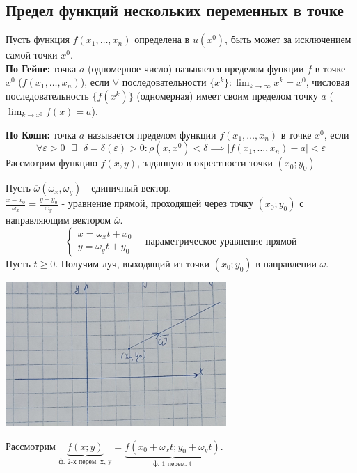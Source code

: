 \documentclass[12pt]{article}
\begin{document}
    \subsection{Предел функций нескольких переменных в точке}
    \noindent Пусть функция $f(x_1, \dots, x_n)$ определена в $u(x^0)$, быть может за исключением самой точки $x^0$.\\
    \textbf{По Гейне:} точка $a$ (одномерное число) называется пределом функции $f$ в точке $x^0$ ($f(x_1, \dots, x_n)$), если $\forall$ последовательности $\{x^k\} : \lim_{k\to\infty}x^k=x^0$, числовая последовательность $\{ f(x^k) \}$ (одномерная) имеет своим пределом точку $a$ ($\lim_{k\to x^0}f(x)=a$).\par\noindent
    \textbf{По Коши:} точка $a$ называется пределом функции $f(x_1, \dots, x_n)$ в точке $x^0$, если
    \[ \forall \varepsilon > 0 \text{ } \exists \text{ } \delta = \delta(\varepsilon) > 0 : \rho(x, x^0) < \delta \implies |f(x_1, \dots, x_n) - a| < \varepsilon \]
    Рассмотрим функцию $f(x,y)$, заданную в окрестности точки $(x_0; y_0)$
    \begin{adjustwidth}{1.5em}{1.5em}
        Пусть $\overline{\omega} (\omega_x, \omega_y)$ - единичный вектор.\\
        $\frac{x - x_0}{\omega_x} = \frac{y - y_0}{\omega_y}$ - уравнение прямой, проходящей через точку $(x_0; y_0)$ с направляющим вектором $\overline{\omega}$.
        \[ \begin{cases}
            x = \omega_xt + x_0\\
            y = \omega_yt + y_0
        \end{cases}\text{ - параметрическое уравнение прямой} \]
        Пусть $t \ge 0$. Получим луч, выходящий из точки $(x_0; y_0)$ в направлении $\overline{\omega}$.
        \begin{center}
            \includegraphics{7.2.1.png}
        \end{center}
        Рассмотрим $\underbrace{f(x; y)}_{\text{ф. 2-х перем. x, y}} = \underbrace{f(x_0+\omega_xt; y_0+\omega_yt)}_{\text{ф. 1 перем. t}}$.
    \end{adjustwidth}
\end{document}
